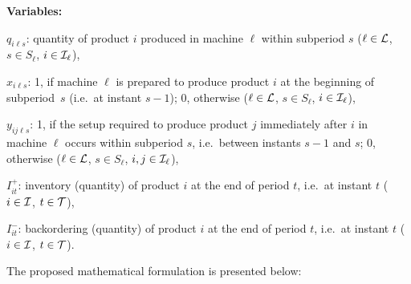 \documentclass[11pt]{article}
\begin{document}
\noindent
\textbf{Variables:}
\begin{description}[topsep=2pt,itemsep=1pt]
\item[]$q_{i\ell s}$: quantity of product $i$ produced in machine $\ell$ within subperiod $s$ ($\ell \in {\cal L}$, $s \in S_{\ell}$, $i \in {\cal I_{\ell}}$), 
\item[]$x_{i\ell s}$: 1, if machine $\ell$ is prepared to produce product $i$ at the beginning of subperiod~$s$ (i.e.\ at instant $s-1$); 0, otherwise ($\ell \in {\cal L}$, $s \in S_{\ell}$, $i \in {\cal I_{\ell}}$),
\item[]$y_{ij\ell s}$:	1, if the setup required to produce product $j$ immediately after $i$ in machine $\ell$ occurs within subperiod $s$, i.e.\ between instants $s-1$ and $s$; 0, otherwise ($\ell \in {\cal L}$, $s \in S_{\ell}$, $i, j \in {\cal I_{\ell}}$),
\item[]$I_{it}^+$: inventory (quantity) of product $i$ at the end of period $t$, i.e.\ at instant $t$ ($i \in {\cal I}$, $t \in {\cal T}$),
\item[]$I_{it}^-$: backordering (quantity) of product $i$ at the end of period $t$, i.e.\ at instant $t$ ($i \in {\cal I}$, $t \in {\cal T}$).
\end{description}

The proposed mathematical formulation is presented below:
 
\end{document}
